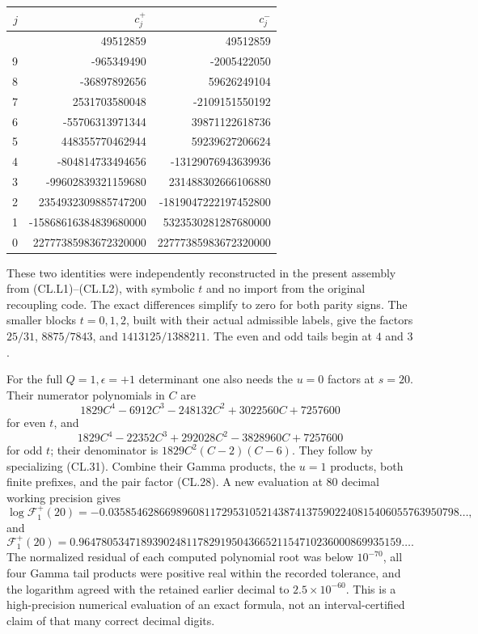 \begin{longtable}[]{@{}rrr@{}}
\toprule\noalign{}
\(j\) & \(c_j^+\) & \(c_j^-\) \\
\midrule\noalign{}
\endhead
\bottomrule\noalign{}
\endlastfoot
10 & 49512859 & 49512859 \\
9 & -965349490 & -2005422050 \\
8 & -36897892656 & 59626249104 \\
7 & 2531703580048 & -2109151550192 \\
6 & -55706313971344 & 39871122618736 \\
5 & 448355770462944 & 59239627206624 \\
4 & -804814733494656 & -13129076943639936 \\
3 & -99602839321159680 & 231488302666106880 \\
2 & 2354932309885747200 & -1819047222197452800 \\
1 & -15868616384839680000 & 5323530281287680000 \\
0 & 22777385983672320000 & 22777385983672320000 \\
\end{longtable}

These two identities were independently reconstructed in the present assembly from (CL.L1)--(CL.L2), with symbolic \(t\) and no import from the original recoupling code. The exact differences simplify to zero for both parity signs. The smaller blocks \(t=0,1,2\), built with their actual admissible labels, give the factors \(25/31\), \(8875/7843\), and \(1413125/1388211\). The even and odd tails begin at \(4\) and \(3\).

For the full \(Q=1,\epsilon=+1\) determinant one also needs the \(u=0\) factors at \(s=20\). Their numerator polynomials in \(C\) are \[
1829C^4-6912C^3-248132C^2+3022560C+7257600
\] for even \(t\), and \[
1829C^4-22352C^3+292028C^2-3828960C+7257600
\] for odd \(t\); their denominator is \(1829C^2(C-2)(C-6)\). They follow by specializing (CL.31). Combine their Gamma products, the \(u=1\) products, both finite prefixes, and the pair factor (CL.28). A new evaluation at 80 decimal working precision gives \[
\log\mathcal F_1^+(20)=
-0.03585462866989608117295310521438741375902240815406055763950798\ldots,
\tag{CL.L9}
\] and \[
\mathcal F_1^+(20)=
0.964780534718939024811782919504366521154710236000869935159\ldots.
\] The normalized residual of each computed polynomial root was below \(10^{-70}\), all four Gamma tail products were positive real within the recorded tolerance, and the logarithm agreed with the retained earlier decimal to \(2.5\times10^{-60}\). This is a high-precision numerical evaluation of an exact formula, not an interval-certified claim of that many correct decimal digits.


